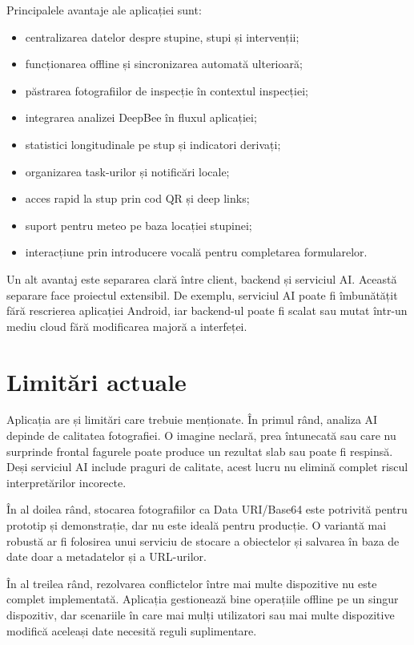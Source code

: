 Principalele avantaje ale aplicației sunt:
\begin{itemize}
	\item centralizarea datelor despre stupine, stupi și intervenții;
	\item funcționarea offline și sincronizarea automată ulterioară;
	\item păstrarea fotografiilor de inspecție în contextul inspecției;
	\item integrarea analizei DeepBee în fluxul aplicației;
	\item statistici longitudinale pe stup și indicatori derivați;
	\item organizarea task-urilor și notificări locale;
	\item acces rapid la stup prin cod QR și deep links;
	\item suport pentru meteo pe baza locației stupinei;
	\item interacțiune prin introducere vocală pentru completarea formularelor.
\end{itemize}

Un alt avantaj este separarea clară între client, backend și serviciul AI. Această separare face proiectul extensibil. De exemplu, serviciul AI poate fi îmbunătățit fără rescrierea aplicației Android, iar backend-ul poate fi scalat sau mutat într-un mediu cloud fără modificarea majoră a interfeței.

\section{Limitări actuale}

Aplicația are și limitări care trebuie menționate. În primul rând, analiza AI depinde de calitatea fotografiei. O imagine neclară, prea întunecată sau care nu surprinde frontal fagurele poate produce un rezultat slab sau poate fi respinsă. Deși serviciul AI include praguri de calitate, acest lucru nu elimină complet riscul interpretărilor incorecte.

În al doilea rând, stocarea fotografiilor ca Data URI/Base64 este potrivită pentru prototip și demonstrație, dar nu este ideală pentru producție. O variantă mai robustă ar fi folosirea unui serviciu de stocare a obiectelor și salvarea în baza de date doar a metadatelor și a URL-urilor.

În al treilea rând, rezolvarea conflictelor între mai multe dispozitive nu este complet implementată. Aplicația gestionează bine operațiile offline pe un singur dispozitiv, dar scenariile în care mai mulți utilizatori sau mai multe dispozitive modifică aceleași date necesită reguli suplimentare.

